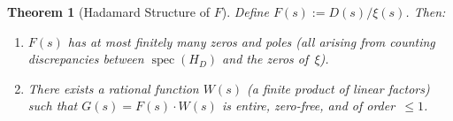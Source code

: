 \documentclass[11pt,a4paper]{article}
\theoremstyle{plain}
\newtheorem{theorem}{Theorem}[section]
\theoremstyle{remark}
\DeclareMathOperator{\spec}{spec}
\begin{document}
%
%

\begin{theorem}[Hadamard Structure of $F$]\label{thm:hadamard-F}
Define $F(s):=D(s)/\xi(s)$.  Then:
\begin{enumerate}[nosep,label=(\roman*)]
  \item $F(s)$ has at most finitely many zeros and poles (all arising from
        counting discrepancies between $\spec(H_D)$ and the zeros of~$\xi$).
  \item There exists a rational function $W(s)$ (a finite product of
        linear factors) such that $G(s)=F(s)\cdot W(s)$ is entire,
        zero-free, and of order~$\leq 1$.
\end{enumerate}
\end{theorem}
\end{document}
